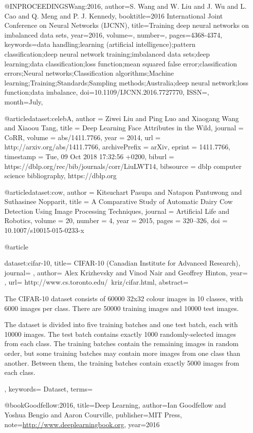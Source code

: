 @INPROCEEDINGS{Wang:2016,
author={S. {Wang} and W. {Liu} and J. {Wu} and L. {Cao} and Q. {Meng} and P. J. {Kennedy}},
booktitle={2016 International Joint Conference on Neural Networks (IJCNN)},
title={Training deep neural networks on imbalanced data sets},
year={2016},
volume={},
number={},
pages={4368-4374},
keywords={data handling;learning (artificial intelligence);pattern classification;deep neural network training;imbalanced data sets;deep learning;data classification;loss function;mean squared false error;classification errors;Neural networks;Classification algorithms;Machine learning;Training;Standards;Sampling methods;Australia;deep neural network;loss function;data imbalance},
doi={10.1109/IJCNN.2016.7727770},
ISSN={},
month={July},}

@article{dataset:celebA,
  author    = {Ziwei Liu and
               Ping Luo and
               Xiaogang Wang and
               Xiaoou Tang},
  title     = {Deep Learning Face Attributes in the Wild},
  journal   = {CoRR},
  volume    = {abs/1411.7766},
  year      = {2014},
  url       = {http://arxiv.org/abs/1411.7766},
  archivePrefix = {arXiv},
  eprint    = {1411.7766},
  timestamp = {Tue, 09 Oct 2018 17:32:56 +0200},
  biburl    = {https://dblp.org/rec/bib/journals/corr/LiuLWT14},
  bibsource = {dblp computer science bibliography, https://dblp.org}
}

@article{dataset:cow,
	author    = {Kitsuchart Pasupa and
	Natapon Pantuwong and
	Suthasinee Nopparit},
	title     = {A Comparative Study of Automatic Dairy Cow Detection Using Image Processing Techniques},
	journal   = {Artificial Life and Robotics},
	volume    = {20},
	number    = {4},  
	year      = {2015},
	pages     = {320--326},
	doi		= {10.1007/s10015-015-0233-x}  
}

@article{dataset:cifar-10,
title= {CIFAR-10 (Canadian Institute for Advanced Research)},
journal= {},
author= {Alex Krizhevsky and Vinod Nair and Geoffrey Hinton},
year= {},
url= {http://www.cs.toronto.edu/~kriz/cifar.html},
abstract= {The CIFAR-10 dataset consists of 60000 32x32 colour images in 10 classes, with 6000 images per class. There are 50000 training images and 10000 test images. 

The dataset is divided into five training batches and one test batch, each with 10000 images. The test batch contains exactly 1000 randomly-selected images from each class. The training batches contain the remaining images in random order, but some training batches may contain more images from one class than another. Between them, the training batches contain exactly 5000 images from each class. },
keywords= {Dataset},
terms= {}
}

@book{Goodfellow:2016,
    title={Deep Learning},
    author={Ian Goodfellow and Yoshua Bengio and Aaron Courville},
    publisher={MIT Press},
    note={\url{http://www.deeplearningbook.org}},
    year={2016}
}